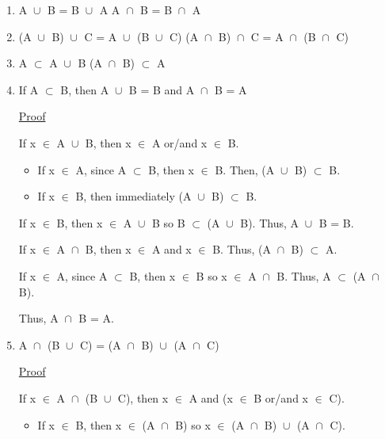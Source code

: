 	\begin{enumerate}[label=(\alph*), leftmargin=2cm, itemsep=0.4em]
		\item A $\cup_{}^{}$ B = B $\cup_{}^{}$ A
			\hspace{4cm} A $\cap_{}^{}$ B = B $\cap_{}^{}$ A

		\item (A $\cup_{}^{}$ B) $\cup_{}^{}$ C = A $\cup_{}^{}$ (B $\cup_{}^{}$ C)
			\hspace{1.6cm} (A $\cap_{}^{}$ B) $\cap_{}^{}$ C = A $\cap_{}^{}$ (B $\cap_{}^{}$ C)

		\item A $\subset$ A $\cup_{}^{}$ B
			\hspace{4.8cm} (A $\cap_{}^{}$ B) $\subset$ A

		\item If A $\subset$ B, then A $\cup_{}^{}$ B = B and A $\cap_{}^{}$ B = A

			{ \color{magenta} \underline{Proof} } 
			
				If x $\in$ A $\cup_{}^{}$ B, then x $\in$ A or/and x $\in$ B.
				\begin{itemize}[leftmargin=1cm, itemsep=0.4em]
					\item If x $\in$ A, since A $\subset$ B, then x $\in$ B.
						Then, (A $\cup_{}^{}$ B) $\subset$ B.

					\item If x $\in$ B, then immediately (A $\cup_{}^{}$ B) $\subset$ B.
				\end{itemize}
				If x $\in$ B, then x $\in$ A $\cup_{}^{}$ B so B $\subset$ (A $\cup_{}^{}$ B).
				Thus, A $\cup_{}^{}$ B = B.

				\vspace{0.5cm}

				If x $\in$ A $\cap_{}^{}$ B, then x $\in$ A and x $\in$ B.
				Thus, (A $\cap_{}^{}$ B) $\subset$ A.

				If x $\in$ A, since A $\subset$ B, then x $\in$ B so x $\in$ A $\cap_{}^{}$ B.
				Thus, A $\subset$ (A $\cap_{}^{}$ B).

				Thus, A $\cap_{}^{}$ B = A.

		\item A $\cap_{}^{}$ (B $\cup_{}^{}$ C) = (A $\cap_{}^{}$ B) $\cup_{}^{}$ (A $\cap_{}^{}$ C)

			{ \color{magenta} \underline{Proof} } 
			
				If x $\in$ A $\cap_{}^{}$ (B $\cup_{}^{}$ C), then x $\in$ A
				and (x $\in$ B or/and x $\in$ C).
				\begin{itemize}[leftmargin=1cm, itemsep=0.4em]
					\item If x $\in$ B, then x $\in$ (A $\cap_{}^{}$ B) so
						x $\in$ (A $\cap_{}^{}$ B) $\cup_{}^{}$ (A $\cap_{}^{}$ C).


\end{itemize}
\end{enumerate}
